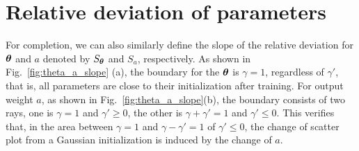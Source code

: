 \documentclass{article}
\begin{document}

\section{Relative deviation of parameters}\label{sec:relapara}
For completion, we can also similarly define the slope of the relative deviation for $\bm{\theta}$ and $a$ denoted by $S_{\bm{\theta}}$ and $S_{a}$, respectively. As shown in
Fig.~\ref{fig:theta_a_slope} (a), the boundary for the $\bm{\theta}$ is $\gamma=1$, regardless of $\gamma'$, that is, all parameters are close to their initialization after training. For output weight $a$, as shown in Fig.~\ref{fig:theta_a_slope}(b), the boundary consists of two rays, one is  $\gamma=1$ and
$\gamma'\geq 0$, the other is $\gamma+\gamma'=1$ and $\gamma'\leq 0$. This verifies that, in the area between  $\gamma=1$ and $\gamma-\gamma'=1$ of  $\gamma'\leq 0$, the change of scatter plot from a Gaussian initialization is induced by the change of $a$.
\end{document}

